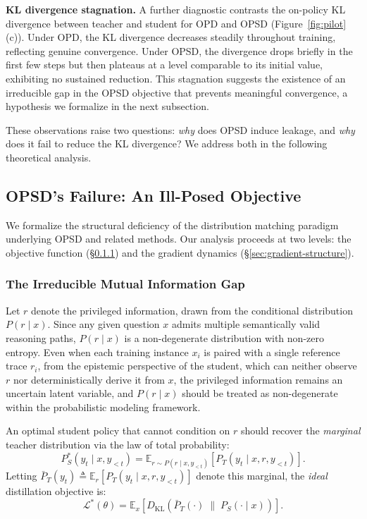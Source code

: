 \documentclass[]{jingdong}
\begin{document}
\noindent \textbf{KL divergence stagnation.}
A further diagnostic contrasts the on-policy KL divergence between teacher and student for OPD and OPSD (Figure~\ref{fig:pilot}(c)). Under OPD, the KL divergence decreases steadily throughout training, reflecting genuine convergence. Under OPSD, the divergence drops briefly in the first few steps but then plateaus at a level comparable to its initial value, exhibiting no sustained reduction. This stagnation suggests the existence of an irreducible gap in the OPSD objective that prevents meaningful convergence, a hypothesis we formalize in the next subsection.

These observations raise two questions: \textit{why} does OPSD induce leakage, and \textit{why} does it fail to reduce the KL divergence? We address both in the following theoretical analysis.


\subsection{OPSD's Failure: An Ill-Posed Objective}
\label{sec:ill-posed}

We formalize the structural deficiency of the distribution matching paradigm underlying OPSD and related methods. Our analysis proceeds at two levels: the objective function (\S\ref{sec:ill-posed-obj}) and the gradient dynamics (\S\ref{sec:gradient-structure}).

\subsubsection{The Irreducible Mutual Information Gap}
\label{sec:ill-posed-obj}

Let $r$ denote the privileged information, drawn from the conditional distribution $P(r \mid x)$. Since any given question $x$ admits multiple semantically valid reasoning paths, $P(r \mid x)$ is a non-degenerate distribution with non-zero entropy. Even when each training instance $x_i$ is paired with a single reference trace $r_i$, from the epistemic perspective of the student, which can neither observe $r$ nor deterministically derive it from $x$, the privileged information remains an uncertain latent variable, and $P(r \mid x)$ should be treated as non-degenerate within the probabilistic modeling framework.

An optimal student policy that cannot condition on $r$ should recover the \textit{marginal} teacher distribution via the law of total probability:
\begin{equation}
    P_S^*(y_t \mid x, y_{<t}) = \mathbb{E}_{r \sim P(r \mid x, y_{<t})}\!\left[P_T(y_t \mid x, r, y_{<t})\right].
\end{equation}
Letting $\bar{P}_T(y_t) \triangleq \mathbb{E}_r[P_T(y_t \mid x, r, y_{<t})]$ denote this marginal, the \textit{ideal} distillation objective is:
\begin{equation}
    \mathcal{L}^*(\theta) = \mathbb{E}_{x}\!\left[D_{\mathrm{KL}}\!\left(\bar{P}_T(\cdot) \;\Big\|\; P_S(\cdot \mid x)\right)\right].
    \label{eq:ideal-obj}
\end{equation}
\end{document}
